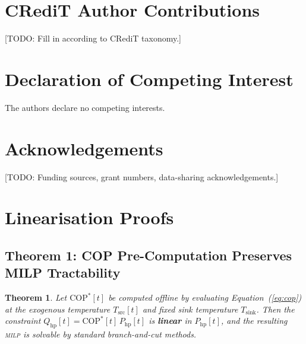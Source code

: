 \documentclass[a4paper,fleqn]{cas-sc}
\newtheorem{theorem}{Theorem}
\newcommand{\Qhp}{Q_{\mathrm{hp}}}
\newcommand{\Php}{P_{\mathrm{hp}}}
\newcommand{\COP}{\mathrm{COP}}
\newcommand{\milp}{\textsc{milp}}
\begin{document}
\section*{CRediT Author Contributions}

[TODO: Fill in according to CRediT taxonomy.]

\section*{Declaration of Competing Interest}

The authors declare no competing interests.

\section*{Acknowledgements}

[TODO: Funding sources, grant numbers, data-sharing acknowledgements.]

\appendix

\section{Linearisation Proofs}
\label{app:proofs}

\subsection{Theorem 1: COP Pre-Computation Preserves MILP Tractability}
\label{app:proof_cop}

\begin{theorem}
Let $\COP^*[t]$ be computed offline by evaluating
Equation~(\ref{eq:cop}) at the exogenous temperature $T_{\mathrm{src}}[t]$
and fixed sink temperature $T_{\mathrm{sink}}$.  Then
the constraint $\Qhp[t] = \COP^*[t]\,\Php[t]$ is
\textbf{linear} in $\Php[t]$, and the resulting \milp{} is
solvable by standard branch-and-cut methods.
\end{theorem}
\end{document}
